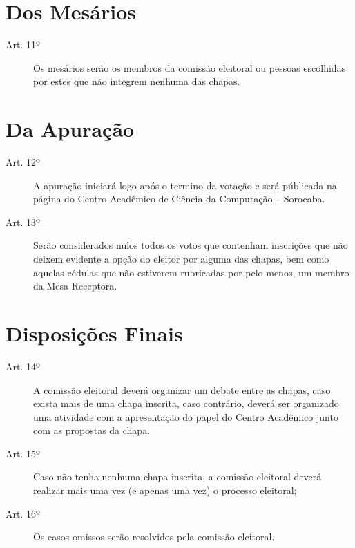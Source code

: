 \documentclass[12pt]{article}
\begin{document}
\section*{Dos Mesários}
\begin{description}
	\item[Art. 11º] Os mesários serão os membros da comissão eleitoral ou pessoas escolhidas por estes que não integrem nenhuma das chapas.
\end{description}
\section*{Da Apuração}
\begin{description}
	\item[Art. 12º] A apuração iniciará logo após o termino da votação e será públicada na página do Centro Acadêmico de Ciência da Computação -- Sorocaba.
	\item[Art. 13º] Serão considerados nulos todos os votos que contenham inscrições que não deixem evidente a opção do eleitor por alguma das chapas, bem como aquelas cédulas que não estiverem rubricadas por pelo menos, um membro da Mesa Receptora.
\end{description}

\section*{Disposições Finais}
\begin{description}
	\item[Art. 14º] A comissão eleitoral deverá organizar um debate entre as chapas, caso exista mais de uma chapa inscrita, caso contrário, deverá ser organizado uma atividade com a apresentação do papel do Centro Acadêmico junto com as propostas da chapa.
	\item[Art. 15º] Caso não tenha nenhuma chapa inscrita, a comissão eleitoral deverá realizar mais uma vez (e apenas uma vez) o processo eleitoral;
	\item[Art. 16º] Os casos omissos serão resolvidos pela comissão eleitoral.
\end{description}
\end{document}
